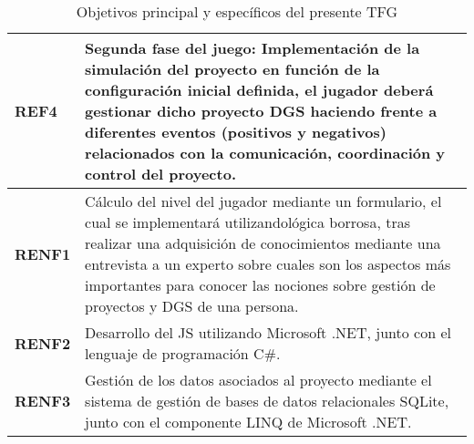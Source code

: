 \begin{table}[thb]
{\begin{tabular}{|l|p{15cm}|}
		\rowcolor[HTML]{FFCE93} 
		{\color[HTML]{000000} \textbf{REF4}}                                                                   & {\color[HTML]{000000} Segunda fase del juego: Implementación de la simulación del proyecto en función de la configuración inicial definida, el jugador deberá gestionar dicho proyecto DGS haciendo frente a diferentes eventos (positivos y negativos) relacionados con la comunicación, coordinación y control del proyecto.}             \\ \hline
		\rowcolor[HTML]{CBCEFB} 
		{\color[HTML]{000000} \textbf{RENF1}}                                                                   & {\color[HTML]{000000} Cálculo del nivel del jugador mediante un formulario, el cual se implementará utilizandológica borrosa, tras realizar una adquisición de conocimientos mediante una entrevista a un experto sobre cuales son los aspectos más importantes para conocer las nociones sobre gestión de proyectos y DGS de una persona.} \\ \hline
		\rowcolor[HTML]{CBCEFB} 
		{\color[HTML]{000000} \textbf{RENF2}}                                                                   & {\color[HTML]{000000} Desarrollo del JS utilizando Microsoft .NET, junto con el lenguaje de programación C\#.}                                                                                                                                                                                                                              \\ \hline
		\rowcolor[HTML]{CBCEFB} 
		{\color[HTML]{000000} \textbf{RENF3}}                                                                   & {\color[HTML]{000000} Gestión de los datos asociados al proyecto mediante el sistema de gestión de bases de datos relacionales SQLite, junto con el componente LINQ de Microsoft .NET.}                                                                                                                                                     \\ \hline
	\end{tabular}}
	\caption{Objetivos principal y específicos del presente TFG}
	\label{tab:ResumenObjetivos}
\end{table}